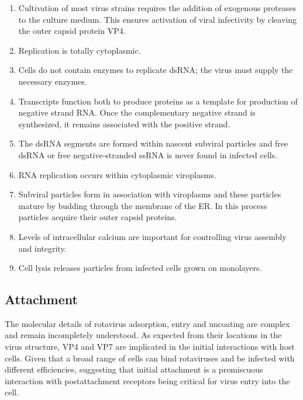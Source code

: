 \begin{enumerate}
	\item Cultivation of most virus strains requires the addition of exogenous proteases to the culture medium. This ensures activation of viral infectivity by cleaving the outer capsid protein VP4.

	\item Replication is totally cytoplasmic.
	
	\item Cells do not contain enzymes to replicate dsRNA; the virus must supply the necessary enzymes.
	
	\item Transcripts function both to produce proteins as a template for production of negative strand RNA. Once the complementary negative strand is synthesized, it remains associated with the positive strand.
	
	\item The dsRNA segments are formed within nascent subviral particles and free dsRNA or free negative-stranded ssRNA is never found in infected cells.
	
	\item RNA replication occurs within cytoplasmic viroplasms.
	
	\item Subviral particles form in association with viroplasms and these particles mature by budding through the membrane of the ER. In this process particles acquire their outer capsid proteins.
	
	\item Levels of intracellular calcium are important for controlling virus assembly and integrity.
	
	\item Cell lysis releases particles from infected cells grown on monolayers.
\end{enumerate}

\subsection{Attachment}

The molecular details of rotavirus adsorption, entry and uncoating are complex and remain incompletely understood. As expected from their locations in the virus structure, VP4 and VP7 are implicated in the initial interactions with host cells. Given that a broad range of cells can bind rotaviruses and be infected with different efficiencies, suggesting that initial attachment is a promiscuous interaction with postattachment receptors being critical for virus entry into the cell.

